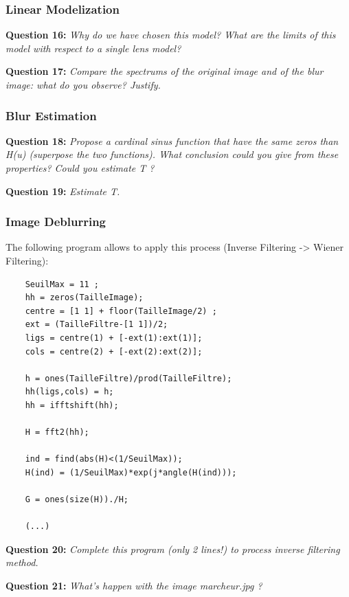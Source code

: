 \subsubsection{Linear Modelization}
\textbf{Question 16:}
\textit{Why do we have chosen this model? What are the limits of this model with respect to a single lens model?}



\textbf{Question 17:}
\textit{Compare the spectrums of the original image and of the blur image: what do you observe? Justify.}



\subsubsection{Blur Estimation}
\textbf{Question 18:}
\textit{Propose a cardinal sinus function that have the same zeros than H(u) (superpose the two functions). What conclusion could you give from these properties? Could you estimate T ?}


\textbf{Question 19:}
\textit{Estimate T.}




\subsubsection{Image Deblurring}

The following program allows to apply this process (Inverse Filtering -> Wiener Filtering):
\begin{lstlisting}
    SeuilMax = 11 ;
    hh = zeros(TailleImage);
    centre = [1 1] + floor(TailleImage/2) ;
    ext = (TailleFiltre-[1 1])/2;
    ligs = centre(1) + [-ext(1):ext(1)];
    cols = centre(2) + [-ext(2):ext(2)];
    
    h = ones(TailleFiltre)/prod(TailleFiltre);
    hh(ligs,cols) = h;
    hh = ifftshift(hh);
    
    H = fft2(hh);
    
    ind = find(abs(H)<(1/SeuilMax));
    H(ind) = (1/SeuilMax)*exp(j*angle(H(ind)));
    
    G = ones(size(H))./H;
    
    (...)
\end{lstlisting}


\textbf{Question 20:}
\textit{Complete this program (only 2 lines!) to process inverse ﬁltering method.}



\textbf{Question 21:}
\textit{What’s happen with the image marcheur.jpg ?}
